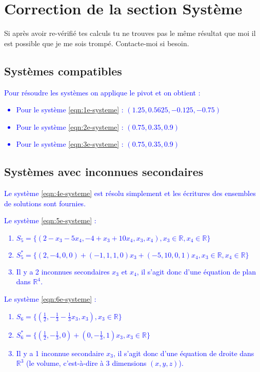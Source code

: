 \documentclass[a4paper]{article}\usepackage[]{graphicx}\usepackage[]{xcolor}
\newcommand{\R}{\mathbb{R}}
\begin{document}
\newpage

\section*{Correction de la section Système}
Si après avoir re-vérifié tes calculs tu ne trouves pas le même résultat que moi
il est possible que je me sois trompé. Contacte-moi si besoin.

\vspace{0,75cm}

\subsection*{Systèmes compatibles}

\textcolor{blue}{Pour résoudre les systèmes on applique le pivot et on obtient :
\begin{itemize}
    \item Pour le système \ref{eqn:1e-systeme} : $(1.25, 0.5625, -0.125, -0.75)$
    \item Pour le système \ref{eqn:2e-systeme} : $(0.75, 0.35, 0.9)$
    \item Pour le système \ref{eqn:3e-systeme} : $(0.75, 0.35, 0.9)$
\end{itemize}}

\subsection*{Systèmes avec inconnues secondaires}
\textcolor{blue}{Le système \ref{eqn:4e-systeme} est résolu simplement et les écritures des 
ensembles de solutions sont fournies.}\\

\textcolor{blue}{Le système \ref{eqn:5e-systeme} :
\begin{enumerate}
    \item $S_5 = \{(2 - x_3 - 5 x_4, -4 + x_3 + 10 x_4, x_3, x_4), x_3\in\R, x_4 \in \R \}$
    \item $S_5^* = \{(2, -4, 0, 0) + (-1, 1, 1, 0) x_3 + (-5, 10, 0, 1) x_4, x_3\in\R, x_4 \in \R \}$
    \item Il y a 2 inconnues secondaires $x_3$ et $x_4$, il s'agit donc d'une équation de plan dans $\R^4$.
\end{enumerate}}

\textcolor{blue}{Le système \ref{eqn:6e-systeme} :
\begin{enumerate}
    \item $S_6 = \{(\frac{1}{2}, -\frac{1}{3} -\frac{1}{3} x_3, x_3), x_3\in\R\}$
    \item $S_6^* = \{(\frac{1}{2}, - \frac{1}{3}, 0) + (0, -\frac{1}{3}, 1) x_3, x_3\in\R\}$
    \item Il y a 1 inconnue secondaire $x_3$, il s'agit donc d'une équation de droite dans $\R^3$ (le volume, c'est-à-dire à 3 dimensions $(x,y,z)$).
\end{enumerate}}
\end{document}
